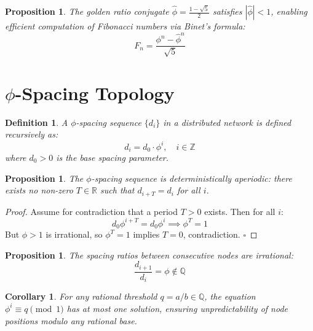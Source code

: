 \documentclass[12pt]{article}
\newtheorem lemma}[theorem]{Lemma}
\newtheorem{corollary}[theorem]{Corollary}
\newtheorem{definition}{Definition}
\newtheorem{prop}[theorem]{Proposition}
\begin{document}
\begin{prop}
The golden ratio conjugate $\hat{\phi} = \frac{1-\sqrt{5}}{2}$ satisfies $|\hat{\phi}| < 1$, enabling efficient computation of Fibonacci numbers via Binet's formula:
\begin{equation}
F_n = \frac{\phi^n - \hat{\phi}^n}{\sqrt{5}}
\label{eq:binet}
\end{equation}
\end{prop}

\section{$\phi$-Spacing Topology}

\begin{definition}
A $\phi$-spacing sequence $\{d_i\}$ in a distributed network is defined recursively as:
\begin{equation}
d_i = d_0 \cdot \phi^i, \quad i \in \mathbb{Z}
\label{eq:phi_spacing}
\end{equation}
where $d_0 > 0$ is the base spacing parameter.
\end{definition}

\begin{prop}
The $\phi$-spacing sequence is \emph{deterministically aperiodic}: there exists no non-zero $T \in \mathbb{R}$ such that $d_{i+T} = d_i$ for all $i$.
\end{prop}

\begin{proof}
Assume for contradiction that a period $T > 0$ exists. Then for all $i$:
\begin{equation}
d_0 \phi^{i+T} = d_0 \phi^i \implies \phi^T = 1
\end{equation}
But $\phi > 1$ is irrational, so $\phi^T = 1$ implies $T = 0$, contradiction. $\square$
\end{proof}

\begin{prop}
The spacing ratios between consecutive nodes are irrational:
\begin{equation}
\frac{d_{i+1}}{d_i} = \phi \notin \mathbb{Q}
\label{eq:irrational_ratio}
\end{equation}
\end{prop}

\begin{corollary}
For any rational threshold $q = a/b \in \mathbb{Q}$, the equation $\phi^i \equiv q \pmod{1}$ has at most one solution, ensuring unpredictability of node positions modulo any rational base.
\end{corollary}
\end{document}
